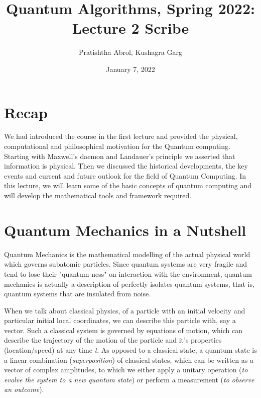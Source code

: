 \documentclass[11.5pt, paper=a4]{article}
\title{Quantum Algorithms, Spring 2022: Lecture 2 Scribe}
\author{Pratishtha Abrol, Kushagra Garg}
\date{January 7, 2022}
\theoremstyle{definition}
\numberwithin{theorem}{section}
\begin{document}
\maketitle
\section{Recap}
We had introduced the course in the first lecture and provided the physical, computational and philosophical motivation for the Quantum computing. Starting with Maxwell's daemon and Landauer's principle we asserted that information is physical. Then we discussed the historical developments, the key events and current and future outlook for the field of Quantum Computing.
In this lecture, we will learn some of the basic concepts of quantum computing and will develop the mathematical tools and framework required.

\section{Quantum Mechanics in a Nutshell}
Quantum Mechanics is the mathematical modelling of the actual physical world which governs subatomic particles. Since quantum systems are very fragile and tend to lose their "quantum-ness" on interaction with the environment, quantum mechanics is actually a description of perfectly isolates quantum systems, that is, quantum systems that are insulated from noise.

When we talk about classical physics, of a particle with an initial velocity and particular initial local coordinates, we can describe this particle with, say a vector. Such a classical system is governed by equations of motion, which can describe the trajectory of the motion of the particle and it's properties (location/speed) at any time \textit{t}.
As opposed to a classical state, a quantum state is a linear combination (\textit{superposition}) of classical states, which can be written as a vector of complex amplitudes, to which we either apply a unitary operation (\textit{to evolve the system to a new quantum state}) or perform a measurement (\textit{to observe an outcome}).
\end{document}
